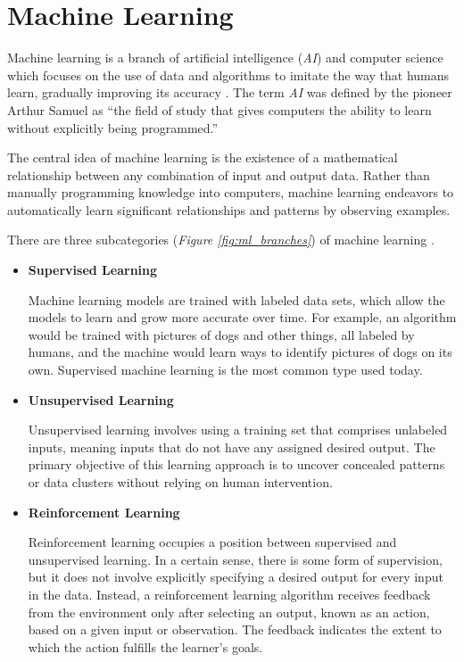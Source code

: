 \newpage

\section{Machine Learning}

Machine learning is a branch of artificial intelligence (\textit{AI}) and
computer science which focuses on the use of data and algorithms to imitate the
way that humans learn, gradually improving its accuracy
\cite{IBMMachineLearning}. The term \textit{AI} was defined by the pioneer
Arthur Samuel as “the field of study that gives computers the ability to learn
without explicitly being programmed.” \newline

The central idea of machine learning is the existence of a mathematical
relationship between any combination of input and output data. Rather than
manually programming knowledge into computers, machine learning endeavors to
automatically learn significant relationships and patterns by observing
examples. \newline

There are three subcategories (\textit{Figure \ref{fig:ml_branches}}) of
machine learning \cite{MITML}.
\newline

\begin{itemize}
  \item \textbf{Supervised Learning}

    Machine learning models are trained with labeled data sets, which allow
    the models to learn and grow more accurate over time. For example, an
    algorithm would be trained with pictures of dogs and other things, all
    labeled by humans, and the machine would learn ways to identify pictures
    of dogs on its own. Supervised machine learning is the most common type
    used today. \newline

  \item \textbf{Unsupervised Learning}

    Unsupervised learning involves using a training set that comprises
    unlabeled inputs, meaning inputs that do not have any assigned desired
    output. The primary objective of this learning approach is to uncover
    concealed patterns or data clusters without relying on human
    intervention. \newline

  \item \textbf{Reinforcement Learning}

    Reinforcement learning occupies a position between supervised and
    unsupervised learning. In a certain sense, there is some form of
    supervision, but it does not involve explicitly specifying a desired
    output for every input in the data. Instead, a reinforcement learning
    algorithm receives feedback from the environment only after selecting an
    output, known as an action, based on a given input or observation. The
    feedback indicates the extent to which the action fulfills the learner's
    goals. \newline

\end{itemize}

